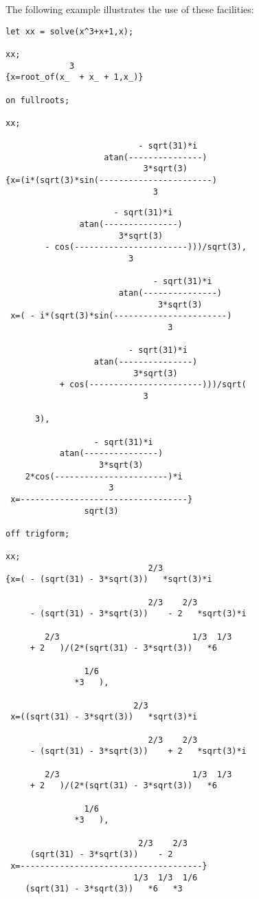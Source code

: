 The following example illustrates the use of these facilities:
\begin{verbatim}
let xx = solve(x^3+x+1,x);

xx;
             3
{x=root_of(x_  + x_ + 1,x_)}

on fullroots;

xx;

                           - sqrt(31)*i
                    atan(---------------)
                            3*sqrt(3)
{x=(i*(sqrt(3)*sin(-----------------------)
                              3
\end{verbatim}
\newpage
\begin{verbatim}
                      - sqrt(31)*i
               atan(---------------)
                       3*sqrt(3)
        - cos(-----------------------)))/sqrt(3),
                         3

                              - sqrt(31)*i
                       atan(---------------)
                               3*sqrt(3)
 x=( - i*(sqrt(3)*sin(-----------------------)
                                 3

                         - sqrt(31)*i
                  atan(---------------)
                          3*sqrt(3)
           + cos(-----------------------)))/sqrt(
                            3

      3),

                  - sqrt(31)*i
           atan(---------------)
                   3*sqrt(3)
    2*cos(-----------------------)*i
                     3
 x=----------------------------------}
                sqrt(3)

off trigform;

xx;
                             2/3
{x=( - (sqrt(31) - 3*sqrt(3))   *sqrt(3)*i

                             2/3    2/3
     - (sqrt(31) - 3*sqrt(3))    - 2   *sqrt(3)*i

        2/3                           1/3  1/3
     + 2   )/(2*(sqrt(31) - 3*sqrt(3))   *6

                1/6
              *3   ),

                          2/3
 x=((sqrt(31) - 3*sqrt(3))   *sqrt(3)*i

                             2/3    2/3
     - (sqrt(31) - 3*sqrt(3))    + 2   *sqrt(3)*i

        2/3                           1/3  1/3
     + 2   )/(2*(sqrt(31) - 3*sqrt(3))   *6

                1/6
              *3   ),

                           2/3    2/3
     (sqrt(31) - 3*sqrt(3))    - 2
 x=-------------------------------------}
                          1/3  1/3  1/6
    (sqrt(31) - 3*sqrt(3))   *6   *3
\end{verbatim}


